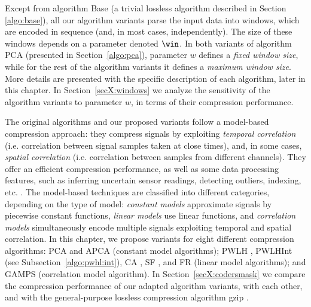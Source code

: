 Except from algorithm Base (a trivial lossless algorithm described in Section \ref{algo:base}), all our algorithm variants parse the input data into windows, which are encoded in sequence (and, in most cases, independently). The size of these windows depends on a parameter denoted $\win$. In both variants of algorithm PCA (presented in Section~\ref{algo:pca}), parameter $w$ defines a \textit{fixed window size}, while for the rest of the algorithm variants it defines a \textit{maximum window size}. More details are presented with the specific description of each algorithm, later in this chapter. In Section~\ref{secX:windows} we analyze the sensitivity of the algorithm variants to parameter $w$, in terms of their compression performance.


The original algorithms and our proposed variants follow a model-based compression approach: they compress signals by exploiting \textit{temporal correlation} (i.e. correlation between signal samples taken at close times), and, in some cases, \textit{spatial correlation} (i.e. correlation between samples from different channels). They offer an efficient compression performance, as well as some data processing features, such as inferring uncertain sensor readings, detecting outliers, indexing, etc. \cite{AnEva2013}. The model-based techniques are classified into different categories, depending on the type of model: \textit{constant models} approximate signals by piecewise constant functions, \textit{linear models} use linear functions, and \textit{correlation models} simultaneously encode multiple signals exploiting temporal and spatial correlation.  In this chapter, we propose variants for eight different compression algorithms: PCA \cite{coder:pca} and APCA \cite{coder:apca} (constant model algorithms); PWLH \cite{coder:pwlh}, PWLHInt (see Subsection~\ref{algo:pwhl:int}), CA \cite{coder:ca}, SF \cite{coder:sf}, and FR \cite{coder:fr} (linear model algorithms); and GAMPS \cite{coder:gamps} (correlation model algorithm). In Section~\ref{secX:codersmask} we compare the compression performance of our adapted algorithm variants, with each other, and with the general-purpose lossless compression algorithm gzip \cite{gzip}.


